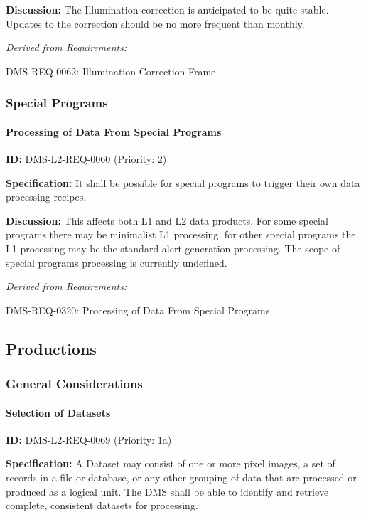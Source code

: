 \documentclass[SE,toc,lsstdraft]{lsstdoc}
\begin{document}
\textbf{Discussion:} The Illumination correction is anticipated to be quite stable. Updates to the correction should be no more frequent than monthly.

\emph{Derived from Requirements:}

DMS-REQ-0062:
Illumination Correction Frame \newline

\subsubsection{Special Programs}

\paragraph{Processing of Data From Special Programs}\hfill  %

\label{DMS-L2-REQ-0060}
\textbf{ID:} DMS-L2-REQ-0060 (Priority: 2)

\textbf{Specification:} It shall be possible for special programs to trigger their own data processing recipes.

\textbf{Discussion:} This affects both L1 and L2 data products. For some special programs there may be minimalist L1 processing, for other special programs the L1 processing may be the standard alert generation processing. The scope of special programs processing is currently undefined.

\emph{Derived from Requirements:}

DMS-REQ-0320:
Processing of Data From Special Programs \newline

\subsection{Productions}

\subsubsection{General Considerations}

\paragraph{Selection of Datasets}\hfill  %

\label{DMS-L2-REQ-0069}
\textbf{ID:} DMS-L2-REQ-0069 (Priority: 1a)

\textbf{Specification:} A Dataset may consist of one or more pixel images, a set of records in a file or database, or any other grouping of data that are processed or produced as a logical unit. The DMS shall be able to identify and retrieve complete, consistent datasets for processing.
\end{document}
